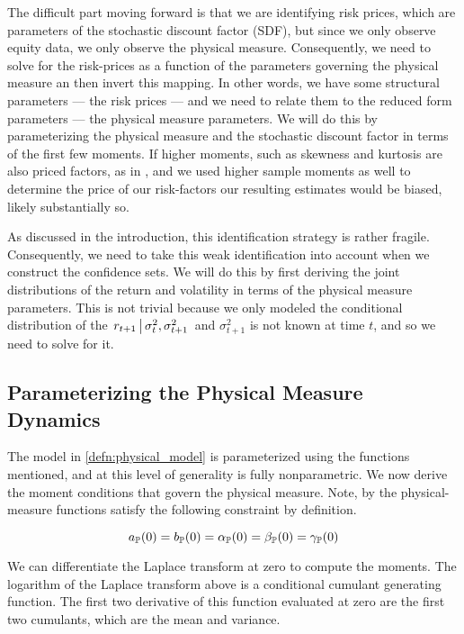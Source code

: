 \documentclass[11pt, letterpaper, twoside, final]{article}
\begin{document}
The difficult part moving forward is that we are identifying risk prices, which are  parameters of the stochastic
discount factor (SDF), but since we only observe equity data, we only observe the physical measure.
Consequently, we need to solve for the risk-prices as a function of the parameters governing the physical measure
an then invert this mapping.
In other words, we have some structural parameters --- the risk prices --- and we need to relate them to the
reduced form parameters --- the physical measure parameters.
We will do this by parameterizing the physical measure and the stochastic discount factor in terms of the first
few moments.
If higher moments, such as skewness and kurtosis are also priced factors, as in \textcites{harvey2000conditional,
conrad2012exante, chang2013market},  and we used higher sample moments as well to determine the price of our
risk-factors our resulting estimates would be biased, likely substantially so. 

As discussed in the introduction, this identification strategy is rather fragile.
Consequently, we need to take this weak identification into account when we construct the confidence sets.
We will do this by first deriving the joint distributions of the return and volatility in terms of the physical
measure parameters.
This is not trivial because we only modeled the conditional distribution of the $\left. r_{t+1} \,\middle\vert\, \sigma^2_{t},
\sigma^2_{t+1} \right.$  and $\sigma^2_{t+1}$ is not known at time $t$, and so we need to solve for it.


\subsection{Parameterizing the Physical Measure Dynamics}

The model in \cref{defn:physical_model} is parameterized using the functions mentioned, and at this level of
generality is fully nonparametric. 
We now derive the moment conditions that govern the physical measure. 
Note, by the physical-measure functions satisfy the following constraint by definition.

\begin{equation}
    a_{\mathbb{P}}(0) = b_{\mathbb{P}}(0) = \alpha_{\mathbb{P}}(0) = \beta_{\mathbb{P}}(0) = \gamma_{\mathbb{P}}(0) 
\end{equation}

We can differentiate the Laplace transform at zero to compute the moments.
The logarithm of the Laplace transform above is a conditional cumulant generating function.
The first two derivative of this function evaluated at zero are the first two cumulants, which are the mean and
variance. 
\end{document}
